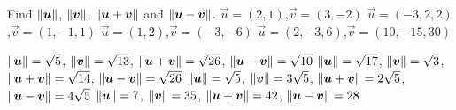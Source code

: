 
\begin{Exercise}[
name={},
title={}, 
difficulty=0,
origin={\cite{GHC}}]
Find $\lVert\bm{u}\rVert$, $\lVert\bm{v}\rVert$, $\lVert\bm{u}+\bm{v}\rVert$ and $\lVert\bm{u}-\bm{v}\rVert$.
\Question $\vec u=(2,1)$,\quad $\vec v = (3,-2)$
\Question $\vec u=(-3,2,2)$,\quad $\vec v = (1,-1,1)$
\Question $\vec u=(1,2)$,\quad $\vec v = (-3,-6)$
\Question $\vec u=(2,-3,6)$,\quad $\vec v = (10,-15,30)$
\end{Exercise}

\begin{Answer}
\Question $\lVert\bm{u}\rVert = \sqrt{5}$, $\lVert\bm{v}\rVert = \sqrt{13}$, $\lVert\bm{u}+\bm{v}\rVert = \sqrt{26}$, $\lVert\bm{u}-\bm{v}\rVert = \sqrt{10}$
\Question $\lVert\bm{u}\rVert = \sqrt{17}$, $\lVert\bm{v}\rVert = \sqrt{3}$, $\lVert\bm{u}+\bm{v}\rVert = \sqrt{14}$, $\lVert\bm{u}-\bm{v}\rVert = \sqrt{26}$
\Question $\lVert\bm{u}\rVert = \sqrt{5}$, $\lVert\bm{v}\rVert = 3\sqrt{5}$, $\lVert\bm{u}+\bm{v}\rVert = 2\sqrt{5}$, $\lVert\bm{u}-\bm{v}\rVert = 4\sqrt{5}$
\Question $\lVert\bm{u}\rVert = 7$, $\lVert\bm{v}\rVert = 35$, $\lVert\bm{u}+\bm{v}\rVert = 42$, $\lVert\bm{u}-\bm{v}\rVert = 28$
\end{Answer}
